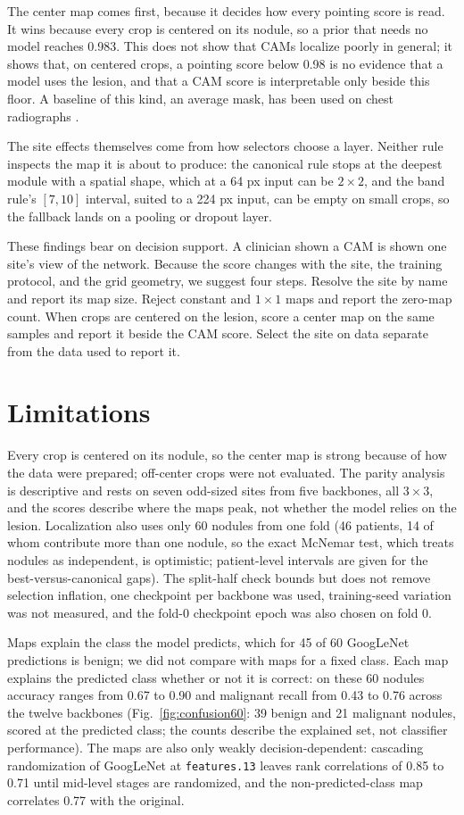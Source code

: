 \documentclass[conference]{IEEEtran}
\begin{document}
The center map comes first, because it decides how every pointing score is read. It wins because every crop is centered on its nodule, so a prior that needs no model reaches 0.983. This does not show that CAMs localize poorly in general; it shows that, on centered crops, a pointing score below 0.98 is no evidence that a model uses the lesion, and that a CAM score is interpretable only beside this floor. A baseline of this kind, an average mask, has been used on chest radiographs \cite{arun_trustworthiness_2021}.

The site effects themselves come from how selectors choose a layer. Neither rule inspects the map it is about to produce: the canonical rule stops at the deepest module with a spatial shape, which at a 64 px input can be $2\times2$, and the band rule's $[7,10]$ interval, suited to a 224 px input, can be empty on small crops, so the fallback lands on a pooling or dropout layer.

These findings bear on decision support. A clinician shown a CAM is shown one site's view of the network. Because the score changes with the site, the training protocol, and the grid geometry, we suggest four steps. Resolve the site by name and report its map size. Reject constant and $1\times1$ maps and report the zero-map count. When crops are centered on the lesion, score a center map on the same samples and report it beside the CAM score. Select the site on data separate from the data used to report it.

\section{Limitations}\label{sec:limits}
Every crop is centered on its nodule, so the center map is strong because of how the data were prepared; off-center crops were not evaluated. The parity analysis is descriptive and rests on seven odd-sized sites from five backbones, all $3\times3$, and the scores describe where the maps peak, not whether the model relies on the lesion. Localization also uses only 60 nodules from one fold (46 patients, 14 of whom contribute more than one nodule, so the exact McNemar test, which treats nodules as independent, is optimistic; patient-level intervals are given for the best-versus-canonical gaps). The split-half check bounds but does not remove selection inflation, one checkpoint per backbone was used, training-seed variation was not measured, and the fold-0 checkpoint epoch was also chosen on fold 0.

Maps explain the class the model predicts, which for 45 of 60 GoogLeNet predictions is benign; we did not compare with maps for a fixed class. Each map explains the predicted class whether or not it is correct: on these 60 nodules accuracy ranges from 0.67 to 0.90 and malignant recall from 0.43 to 0.76 across the twelve backbones (Fig.~\ref{fig:confusion60}: 39 benign and 21 malignant nodules, scored at the predicted class; the counts describe the explained set, not classifier performance). The maps are also only weakly decision-dependent: cascading randomization of GoogLeNet at \texttt{features.13} leaves rank correlations of 0.85 to 0.71 until mid-level stages are randomized, and the non-predicted-class map correlates 0.77 with the original.
\end{document}
